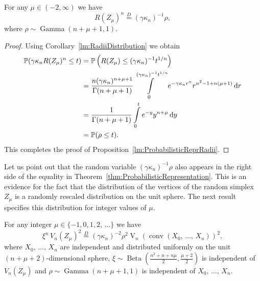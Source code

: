 \documentclass[AHL,Unicode,longabstracts,published]{cedram}
\newcommand{\PP}{\mathbb{P}}
\newcommand{\dd}{{\rm d}}
\newcommand{\V}{\mathop{\mathrm{V}}\nolimits}
\newcommand{\Gam}{\mathop{\mathrm{Gamma}}\nolimits}
\newcommand{\Bet}{\mathop{\mathrm{Beta}}\nolimits}
\newcommand{\eqdistr}{\stackrel{D}{=}}
\newcommand{\conv}{\mathop{\mathrm{conv}}\nolimits}
\begin{document}
\begin{prop}\label{lm:ProbabilisticReprRadii}
For any $\mu\in(-2,\infty)$ we have
\[
R(Z_{\mu})^n\eqdistr (\gamma\kappa_n)^{-1}\rho,
\]
where $\rho\sim\Gam(n+\mu+1,1)$.
\end{prop}
\begin{proof}
Using Corollary~\ref{lm:RadiiDistribution} we obtain
\begin{align*}
\PP(\gamma\kappa_nR(Z_\mu)^n\leq t)&=\PP\left(R(Z_\mu)\leq (\gamma\kappa_n)^{-1}t^{1/n}\right)\\
&=\frac{n(\gamma\kappa_n)^{n+\mu+1}}{\Gamma(n+\mu+1)}\int\limits_{0}^{(\gamma\kappa_n)^{-1}t^{1/n}}e^{-\gamma\kappa_nr^n}r^{n^2-1+n(\mu+1)}\,\dd r\\
&=\frac{1}{\Gamma(n+\mu+1)}\int\limits_{0}^{t}e^{-y}y^{n+\mu}\,\dd y\\
&=\PP(\rho\leq t).
\end{align*}
This completes the proof of Proposition~\ref{lm:ProbabilisticReprRadii}.
\end{proof}

Let us point out that the random variable $(\gamma\kappa_n)^{-1}\rho$ also appears in the right side of the equality in Theorem~\ref{thm:ProbabilisticRepresentation}. This is an evidence for the fact that the distribution of the vertices of the random simplex $Z_{\mu}$ is a randomly rescaled distribution on the unit sphere. The next result specifies this distribution for integer values of $\mu$.

\begin{prop}\label{prop2.8}
For any integer $\mu\in\{-1,0,1,2,\,\ldots\}$ we have
\[
\xi^{n}\,V_n(Z_{\mu})^2\eqdistr (\gamma\kappa_n)^{-2}\rho^{2}\V_n\left(\conv(X_0,\,\ldots,\,X_n)\right)^2,
\]
where $X_0,\,\ldots,\,X_n$ are independent and distributed uniformly on the unit $(n+\mu+2)$-dimensional sphere, $\xi\sim\Bet(\frac{n^2+n+n\mu}{2}, \frac{\mu+2}{2})$ is independent of $V_n(Z_{\mu})$ and $\rho\sim\Gam(n+\mu+1,1)$ is independent of $X_0,\,\ldots,\,X_n$.
\end{prop}
\end{document}
